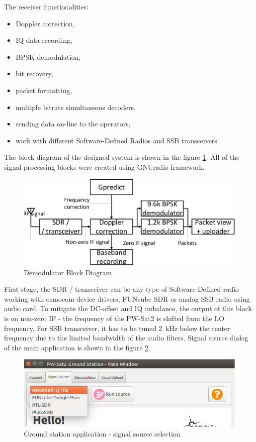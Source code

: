 The receiver  functionalities:
\begin{itemize}
    \item Doppler correction,
    \item IQ data recording,
    \item BPSK demodulation,
    \item bit recovery,
    \item packet formatting,
    \item multiple bitrate simultaneous decoders,
    \item sending data on-line to the operators,
    \item work with different Software-Defined Radios and SSB transceivers
\end{itemize}

The block diagram of the designed system is shown in the figure \ref{demodulator_block_diagram}. All of the signal processing blocks were created using GNUradio framework.

\begin{figure}[H]
    \centering
    \includegraphics[width=0.6\paperwidth]{img/5/demodulator_block_diagram.eps}
    \caption{Demodulator Block Diagram}
    \label{demodulator_block_diagram}
\end{figure}

First stage, the SDR / transceiver can be any type of Software-Defined radio working with osmocom device drivers, FUNcube SDR or analog SSB radio using audio card. To mitigate the DC-offset and IQ imbalance, the output of this block is on non-zero IF - the frequency of the PW-Sat2 is shifted from the LO frequency. For SSB transceiver, it has to be tuned \SI{2}{\kHz} below the center frequency due to the limited bandwidth of the audio filters. Signal source dialog of the main application is shown in the figure \ref{gs_source_selection}.

\begin{figure}[H]
    \centering
    \includegraphics[width=0.6\paperwidth]{img/5/gs_source_selection.png}
    \caption{Ground station application - signal source selection}
    \label{gs_source_selection}
\end{figure}

